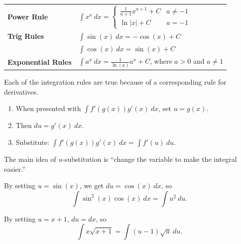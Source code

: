 \begin{center}
\def\arraystretch{1.5}
\begin{tabular}{@{}ll@{}}
\toprule[0.4mm]
\textbf{Power Rule}
 & $\int x^a \ dx = \begin{cases}
\frac{1}{a+1}x^{a+1} + C & a \neq -1\\
\ln|x| + C & a = -1
\end{cases}$ \\
\textbf{Trig Rules}  & $\int \sin(x)\ dx = -\cos(x)+C$\\
                     & $\int \cos(x)\ dx = \sin(x)+C$ \\
\textbf{Exponential Rules} & $\int a^x\ dx = \frac{1}{\ln(a)}a^x+C$, where $a>0$ and $a\ne1$ \\
\bottomrule[0.4mm]
\end{tabular}
\end{center}

Each of the integration rules are true because of a corresponding rule for derivatives. 


\begin{strat}[$u$-substitution]
    \begin{enumerate}[leftmargin=1em]
        \item When presented with $\int f'(g(x))g'(x)\ dx$, set $u=g(x)$.
        \item Then $du=g'(x)\ dx$.
        \item Substitute: $\int f'(g(x))g'(x)\ dx = \int f'(u)\ du$.
    \end{enumerate}
\end{strat}

The main idea of $u$-substitution is ``change the variable to make the integral easier.''


\begin{exampleblock}
    By setting $u=\sin(x)$, we get $du=\cos(x)\ dx$, so
    $$\int \sin^2(x)\cos(x)\ dx= \int u^2\ du.$$
\end{exampleblock}
\begin{exampleblock}
    By setting $u=x+1$, $du=dx$, so
    $$\int x\sqrt{x+1}=\int(u-1)\sqrt{u}\ du.$$
\end{exampleblock}


